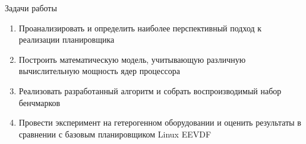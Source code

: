 \documentclass[aspectratio=169,11pt]{beamer}
\begin{document}
\begin{frame}{Задачи работы}
        \footnotesize
        \begin{enumerate}\setlength{\itemsep}{0.3em}
                \item Проанализировать и определить наиболее
                        перспективный подход к реализации планировщика
                \item Построить математическую модель, учитывающую
                        различную вычислительную мощность ядер процессора
                \item Реализовать разработанный алгоритм и
                        собрать воспроизводимый набор бенчмарков
                \item Провести эксперимент на гетерогенном оборудовании
                        и оценить результаты в сравнении с базовым
                        планировщиком Linux EEVDF
        \end{enumerate}
\end{frame}
\end{document}
